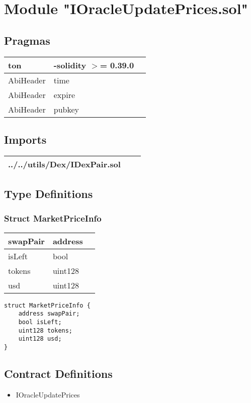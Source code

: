 
\section{Module "IOracleUpdatePrices.sol"}


\subsection{Pragmas}


\noindent\begin{tabular}{|l|l|p{5cm}|}\hline
ton & -solidity $>$= 0.39.0 &\\\hline
AbiHeader &  time &\\\hline
AbiHeader &  expire &\\\hline
AbiHeader &  pubkey &\\\hline
\end{tabular}


\subsection{Imports}


\noindent\begin{tabular}{|l|l|p{5cm}|}\hline
../../utils/Dex/IDexPair.sol &\\\hline
\end{tabular}


\subsection{Type Definitions}


\subsubsection{Struct MarketPriceInfo}


\ifsoltables
\noindent\begin{tabular}{|l|l|p{6cm}|}\hline
swapPair & address & \\\hline
isLeft & bool & \\\hline
tokens & uint128 & \\\hline
usd & uint128 & \\\hline
\end{tabular}
\fi


\begin{lstlisting}[firstnumber=8]
struct MarketPriceInfo {
    address swapPair;
    bool isLeft;
    uint128 tokens;
    uint128 usd;
}
\end{lstlisting}

\subsection{Contract Definitions}

\begin{itemize}
\item IOracleUpdatePrices
\end{itemize}
